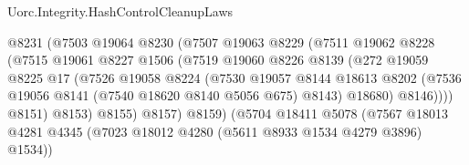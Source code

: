\begin{lexlean}{Uorc.Integrity.HashControlCleanupLaws}
\begin{coremodule}
                                      @8231
                                      (@7503
                                        @19064
                                        @8230
                                        (@7507
                                          @19063
                                          @8229
                                          (@7511
                                            @19062
                                            @8228
                                            (@7515
                                              @19061
                                              @8227
                                              @1506
                                              (@7519
                                                @19060
                                                @8226
                                                @8139
                                                (@272
                                                  @19059
                                                  @8225
                                                  @17
                                                  (@7526
                                                    @19058
                                                    @8224
                                                    (@7530
                                                      @19057
                                                      @8144
                                                      @18613
                                                      @8202
                                                      (@7536
                                                        @19056
                                                        @8141
                                                        (@7540 @18620 @8140 @5056 @675)
                                                        @8143)
                                                      @18680)
                                                    @8146))))
                                            @8151)
                                          @8153)
                                        @8155)
                                      @8157)
                                    @8159)
                                  (@5704
                                    @18411
                                    @5078
                                    (@7567
                                      @18013
                                      @4281
                                      @4345
                                      (@7023 @18012 @4280 (@5611 @8933 @1534 @4279 @3896) @1534))

\end{coremodule}
\end{lexlean}
